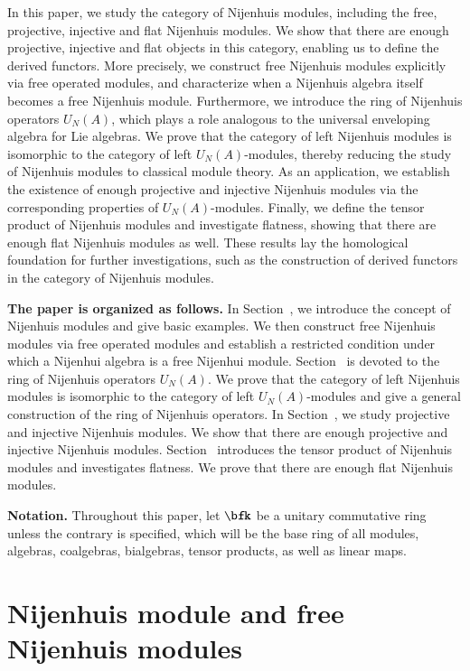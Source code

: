 \documentclass[12pt]{amsart}
\theoremstyle{definition}
\begin{document}
In this paper, we study the category of Nijenhuis modules, including the free, projective, injective and flat Nijenhuis modules. We show that there are enough projective, injective and flat objects in this category, enabling us to define the derived functors. More precisely, we construct free Nijenhuis modules explicitly via free operated modules, and characterize when a Nijenhuis algebra itself becomes a free Nijenhuis module. Furthermore, we introduce the ring of Nijenhuis operators $U_N(A)$, which plays a role analogous to the universal enveloping algebra for Lie algebras. We prove that the category of left Nijenhuis modules is isomorphic to the category of left $U_N(A)$-modules, thereby reducing the study of Nijenhuis modules to classical module theory. As an application, we establish the existence of enough projective and injective Nijenhuis modules via the corresponding properties of $U_N(A)$-modules. Finally, we define the tensor product of Nijenhuis modules and investigate flatness, showing that there are enough flat Nijenhuis modules as well. These results lay the homological foundation for further investigations, such as the construction of derived functors in the category of Nijenhuis modules.


{\bf The paper is organized as follows.} In Section~, we introduce the concept of Nijenhuis modules and give basic examples. We then construct free Nijenhuis modules via free operated modules and establish a restricted condition under which a Nijenhui algebra is a free Nijenhui module.  Section~ is devoted to the ring of Nijenhuis operators $U_N(A)$. We prove that the category of left Nijenhuis modules is isomorphic to the category of left $U_N(A)$-modules and give a general construction of the ring of Nijenhuis operators. In Section~, we study projective and injective Nijenhuis modules. We show that there are enough projective and injective Nijenhuis modules. Section~ introduces the tensor product of Nijenhuis modules and investigates flatness. We prove that there are enough flat Nijenhuis modules.

{\bf Notation.}
Throughout this paper, let $\bfk$ be a unitary commutative ring unless the contrary is specified, which will be the base ring of all modules, algebras, coalgebras, bialgebras, tensor products, as well as linear maps.


\section{Nijenhuis module and free Nijenhuis modules}
\end{document}
